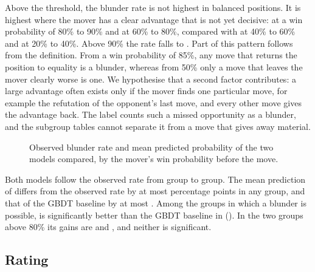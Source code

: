 \documentclass[11pt]{article}
\begin{document}
Above the threshold, the blunder rate is not highest in balanced positions.
It is highest where the mover has a clear advantage that is not yet decisive:
 at a win probability of 80\% to 90\% and
 at 60\% to 80\%, compared with
 at 40\% to 60\% and
 at 20\% to 40\%. Above 90\% the rate falls to
. Part of this pattern follows from the
definition. From a win probability of 85\%, any move that returns the
position to equality is a blunder, whereas from 50\% only a move that leaves
the mover clearly worse is one. We hypothesise that a second factor
contributes: a large advantage often exists only if the mover finds one
particular move, for example the refutation of the opponent's last move, and
every other move gives the advantage back. The label counts such a missed
opportunity as a blunder, and the subgroup tables cannot separate it from a
move that gives away material.

\begin{table}[htbp]\centering\footnotesize
{}
\caption{Test-set results by the mover's win probability before the move.
For each group: the number of test positions, the observed blunder rate, the
mean predicted probability and PR-AUC of each of the two models, and the
paired gain of the first model over the second.}
\label{tab:win}
\end{table}

\begin{figure}[htbp]\centering
{}
\caption{Observed blunder rate and mean predicted probability of the two
models compared, by the mover's win probability before the move.}
\label{fig:win}
\end{figure}

Both models follow the observed rate from group to group. The mean prediction
of  differs from the observed rate by at most
 percentage points in any group, and that
of the GBDT baseline by at most . Among the
groups in which a blunder is possible,  is significantly
better than the GBDT baseline in 
(). In the two groups above 80\% its gains are
 and , and neither is
significant.

\subsection{Rating}
\end{document}
